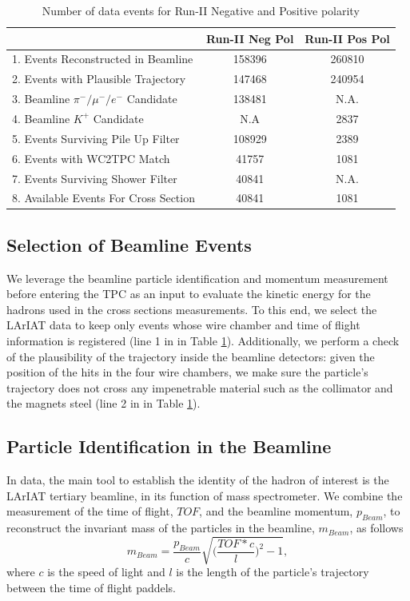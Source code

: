 \begin{table}[b]
\centering
\begin{tabular}{|l|c|c|}
\hline
                                                        & Run-II Neg Pol   &  Run-II Pos Pol  \\ \hline
1. Events Reconstructed in Beamline        &  158396  & 260810  \\ \hline
2. Events with Plausible Trajectory            &   147468 & 240954  \\ \hline
3. Beamline $\pi^-/\mu^-/e^-$  Candidate  &   138481 &     N.A.   \\ \hline
4. Beamline $K^+$   Candidate                 &    N.A       & 2837     \\ \hline
5. Events Surviving Pile Up Filter              &   108929  & 2389       \\ \hline
6. Events with WC2TPC Match                 &    41757   & 1081 \\ \hline
7. Events Surviving Shower Filter             &    40841    &  N.A.     \\ \hline
8. Available Events For Cross Section      &   40841    &   1081    \\ \hline
\end{tabular}
\caption{Number of data events for Run-II Negative and Positive polarity }
\label{tab:beamlineDataSelection}
\end{table}


\subsection{Selection of Beamline Events}\label{ch:beamlineDetectorsData}
We leverage the beamline particle identification and momentum measurement before entering the TPC as an input to evaluate the kinetic energy for the hadrons used in the  cross sections measurements. To this end, we select the LArIAT data to keep only events whose wire chamber and time of flight information is registered (line 1 in in Table \ref{tab:beamlineDataSelection}). Additionally, we perform a check of the plausibility of the trajectory inside the beamline detectors: given the position of the hits in the four wire chambers, we make sure the particle's trajectory does not cross any impenetrable material such as the collimator and the magnets steel (line 2 in in Table \ref{tab:beamlineDataSelection}).


\subsection{Particle Identification in the Beamline}
In data, the main tool to establish the identity of the hadron of interest is the LArIAT tertiary beamline, in its function of mass spectrometer. We combine the measurement of the time of flight, $TOF$, and the beamline momentum, $p_{Beam}$, to reconstruct the invariant mass of the particles in the beamline, $m_{Beam}$, as follows
\begin{equation}
m_{Beam} = \frac{p_{Beam}}{c}\sqrt{\biggl(\frac{TOF*c}{l}\biggr)^2 -1},
\label{eq:mass}
\end{equation}
 where $c$ is the speed of light and $l$ is the length of the particle's trajectory between the time of flight paddels. 

